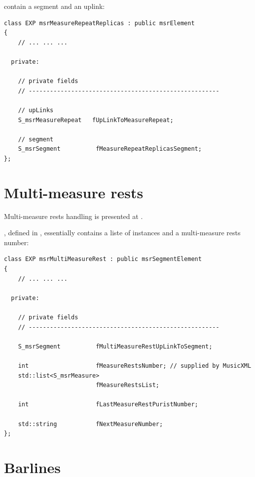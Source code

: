  contain a segment and an uplink:
\begin{lstlisting}[language=CPlusPlus]
class EXP msrMeasureRepeatReplicas : public msrElement
{
	// ... ... ...

  private:

    // private fields
    // ------------------------------------------------------

    // upLinks
    S_msrMeasureRepeat   fUpLinkToMeasureRepeat;

    // segment
    S_msrSegment          fMeasureRepeatReplicasSegment;
};
\end{lstlisting}


\section{Multi-measure rests}\label{Multi-measure rests}

Multi-measure rests handling is presented at .

, defined in , essentially contains a liste of  instances and a multi-measure rests number:
\begin{lstlisting}[language=CPlusPlus]
class EXP msrMultiMeasureRest : public msrSegmentElement
{
	// ... ... ...

  private:

    // private fields
    // ------------------------------------------------------

    S_msrSegment          fMultiMeasureRestUpLinkToSegment;

    int                   fMeasureRestsNumber; // supplied by MusicXML
    std::list<S_msrMeasure>
                          fMeasureRestsList;

    int                   fLastMeasureRestPuristNumber;

    std::string           fNextMeasureNumber;
};
\end{lstlisting}


\section{Barlines}\label{Barlines}


